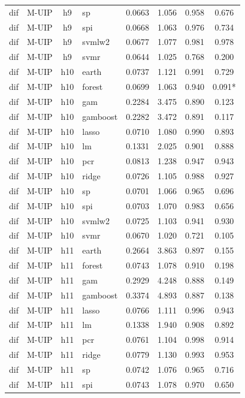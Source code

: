 \begin{ThreePartTable}
\begin{longtable}[t]{llclcccc}
dif & M-UIP & h9 & sp & 0.0663 & 1.056 & 0.958 & 0.676\\
dif & M-UIP & h9 & spi & 0.0668 & 1.063 & 0.976 & 0.734\\
dif & M-UIP & h9 & svmlw2 & 0.0677 & 1.077 & 0.981 & 0.978\\
dif & M-UIP & h9 & svmr & 0.0644 & 1.025 & 0.768 & 0.200\\
\addlinespace
dif & M-UIP & h10 & earth & 0.0737 & 1.121 & 0.991 & 0.729\\
dif & M-UIP & h10 & forest & 0.0699 & 1.063 & 0.940 & 0.091*\\
dif & M-UIP & h10 & gam & 0.2284 & 3.475 & 0.890 & 0.123\\
dif & M-UIP & h10 & gamboost & 0.2282 & 3.472 & 0.891 & 0.117\\
dif & M-UIP & h10 & lasso & 0.0710 & 1.080 & 0.990 & 0.893\\
dif & M-UIP & h10 & lm & 0.1331 & 2.025 & 0.901 & 0.888\\
dif & M-UIP & h10 & pcr & 0.0813 & 1.238 & 0.947 & 0.943\\
dif & M-UIP & h10 & ridge & 0.0726 & 1.105 & 0.988 & 0.927\\
dif & M-UIP & h10 & sp & 0.0701 & 1.066 & 0.965 & 0.696\\
dif & M-UIP & h10 & spi & 0.0703 & 1.070 & 0.983 & 0.656\\
dif & M-UIP & h10 & svmlw2 & 0.0725 & 1.103 & 0.941 & 0.930\\
dif & M-UIP & h10 & svmr & 0.0670 & 1.020 & 0.721 & 0.105\\
\addlinespace
dif & M-UIP & h11 & earth & 0.2664 & 3.863 & 0.897 & 0.155\\
dif & M-UIP & h11 & forest & 0.0743 & 1.078 & 0.910 & 0.198\\
dif & M-UIP & h11 & gam & 0.2929 & 4.248 & 0.888 & 0.149\\
dif & M-UIP & h11 & gamboost & 0.3374 & 4.893 & 0.887 & 0.138\\
dif & M-UIP & h11 & lasso & 0.0766 & 1.111 & 0.996 & 0.943\\
dif & M-UIP & h11 & lm & 0.1338 & 1.940 & 0.908 & 0.892\\
dif & M-UIP & h11 & pcr & 0.0761 & 1.104 & 0.998 & 0.914\\
dif & M-UIP & h11 & ridge & 0.0779 & 1.130 & 0.993 & 0.953\\
dif & M-UIP & h11 & sp & 0.0742 & 1.076 & 0.965 & 0.716\\
dif & M-UIP & h11 & spi & 0.0743 & 1.078 & 0.970 & 0.650\\

\end{longtable}
\end{ThreePartTable}
